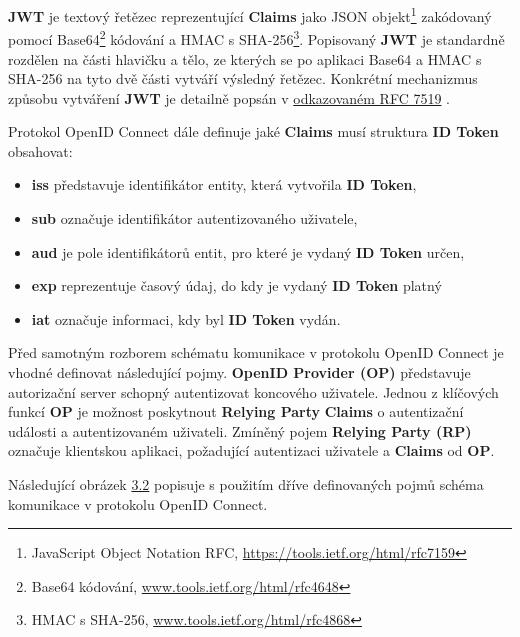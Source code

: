 \documentclass[
  printed, %
  twoside, %
  table,   %
  nolof,     %
  nolot,     %
]{fithesis3}
\begin{document}
\textbf{JWT} je textový řetězec reprezentující \textbf{Claims} jako JSON objekt\footnote{JavaScript Object Notation RFC, \url{https://tools.ietf.org/html/rfc7159}} zakódovaný pomocí Base64\footnote{Base64 kódování, \url{www.tools.ietf.org/html/rfc4648}} kódování a HMAC s SHA-256\footnote{HMAC s SHA-256, \url{ www.tools.ietf.org/html/rfc4868}}.  Popisovaný \textbf{JWT} je standardně rozdělen na části hlavičku a tělo, ze kterých se po aplikaci Base64 a HMAC s SHA-256 na tyto dvě části vytváří výsledný řetězec. Konkrétní mechanizmus způsobu vytváření \textbf{JWT} je detailně popsán v \href{http://www.tools.ietf.org/html/rfc7519}{odkazovaném RFC 7519} . \par

Protokol OpenID Connect dále definuje jaké \textbf{Claims} musí struktura \textbf{ID Token} obsahovat:

\begin{itemize}
    \item \textbf{iss} představuje identifikátor entity, která vytvořila \textbf{ID Token}, 
    \item \textbf{sub} označuje identifikátor autentizovaného uživatele, 
    \item \textbf{aud} je pole identifikátorů entit, pro které je vydaný \textbf{ID Token} určen,
    \item \textbf{exp} reprezentuje časový údaj, do kdy je vydaný \textbf{ID Token} platný
    \item \textbf{iat} označuje informaci, kdy byl \textbf{ID Token} vydán.
\end{itemize}
\par

Před samotným rozborem schématu komunikace v protokolu OpenID Connect je vhodné definovat následující pojmy. \textbf{OpenID Provider (OP)} představuje autorizační server schopný autentizovat koncového uživatele. Jednou z klíčových funkcí \textbf{OP} je možnost poskytnout \textbf{Relying Party} \textbf{Claims} o autentizační události a autentizovaném uživateli. Zmíněný pojem \textbf{Relying Party (RP)} označuje klientskou aplikaci, požadující autentizaci uživatele a \textbf{Claims} od \textbf{OP}. \par
Následující obrázek \hyperref[fig:oidc]{3.2} popisuje s použitím dříve definovaných pojmů schéma komunikace v protokolu OpenID Connect.
\end{document}
